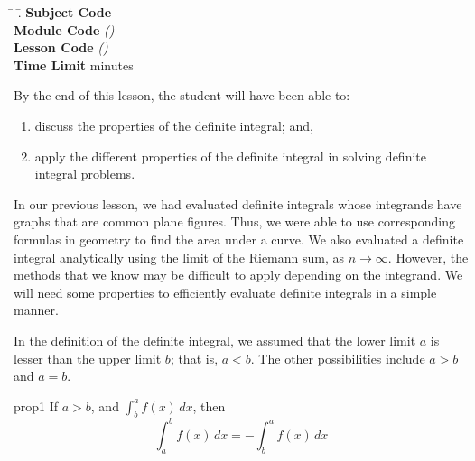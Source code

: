 \documentclass[11pt, a4paper]{article}
\begin{document}
\begin{tabbing}
\hspace*{1in} \= \hspace{1in} \=.\kill
\noindent \textbf{Subject Code} \> {} \\
\textbf{Module Code} \> {} \> \emph{({})}\\
\textbf{Lesson Code} \> {} \> \emph{({})}\\
\textbf{Time Limit}  minutes
\end{tabbing}



\noindent By the end of this lesson, the student will have been able to:
\begin{enumerate}
\item discuss the properties of the definite integral; and,
\item apply the different properties of the definite integral in solving definite integral problems.
\end{enumerate}


In our previous lesson, we had evaluated definite integrals whose integrands have graphs that are common plane figures. Thus, we were able to use corresponding formulas in geometry to find the area under a curve. We also evaluated a definite integral analytically using the limit of the Riemann sum, as $n\to\infty$. However, the methods that we know may be difficult to apply depending on the integrand. We will need some properties to efficiently evaluate definite integrals in a simple manner. 



In the definition of the definite integral, we assumed that the lower limit $a$ is lesser than the upper limit $b$; that is, $a<b$. The other possibilities include $a>b$ and $a=b$.

\begin{property}[]{prop1}
If $a>b$, and $\int_b^a f(x)\, dx$, then
\begin{equation}
\int_a^b f(x)\, dx = -\int_b^a f(x)\, dx
\end{equation}
\end{property}
\end{document}
